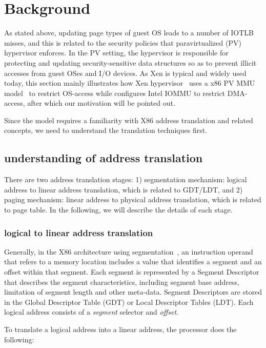 \section{Background}

As stated above, updating page types of guest OS leads to a number of IOTLB misses, and this is related to the security policies that paravirtualized (PV) hypervisor enforces. In the PV setting, the hypervisor is responsible for protecting and updating security-sensitive data structures so as to prevent illicit accesses from guest OSes and I/O devices. As Xen is typical and widely used today, this section mainly illustrates how Xen hypervisor~\cite{XEN-SOPS03} uses a x86 PV MMU model~\cite{x86-pv-model} to restrict OS-access while configures Intel IOMMU to restrict DMA-access, after which our motivation will be pointed out.

Since the model requires a familiarity with X86 address translation and related concepts, we need to understand the translation techniques first.

\subsection{understanding of address translation}

There are two address translation stages: 1) segmentation mechanism: logical address to linear address translation, which is related to GDT/LDT, and 2) paging mechanism: linear address to physical address translation, which is related to page table. In the following, we will describe the details of each stage.

\subsubsection{logical to linear address translation}

Generally, in the X86 architecture using segmentation~\cite{x86}, an instruction operand that refers to a memory location includes a value that identifies a segment and an offset within that segment. Each segment is represented by a Segment Descriptor that describes the segment characteristics, including segment base address, limitation of segment length and other meta-data. Segment Descriptors are stored in the Global Descriptor Table (GDT) or Local Descriptor Tables (LDT). Each logical address consists of a \emph{segment} selector and \emph{offset}.

To translate a logical address into a linear address, the processor does the following:

